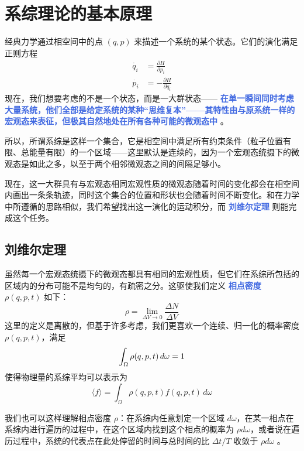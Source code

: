 
\chapter{系综理论的基本原理}\label{cha:系综理论的基本原理}

经典力学通过相空间中的点 $(q,p)$ 来描述一个系统的某个状态。它们的演化满足正则方程
\begin{align*}
    \dot{q_i} &= \frac{\partial H}{\partial p_i} \\
    \dot{p_i} &= -\frac{\partial H}{\partial q_i}
\end{align*}
现在，我们想要考虑的不是一个状态，而是一大群状态——  \textcolor{RoyalBlue}{\textbf{\kaishu 在单一瞬间同时考虑大量系统，他们全部是给定系统的某种“思维复本”——其特性由与原系统一样的宏观态来表征，但极其自然地处在所有各种可能的微观态中}} \cite{Pathria}。

所以，所谓系综是这样一个集合，它是相空间中满足所有约束条件（粒子位置有限、总能量有限）的一个区域——这里默认是连续的，因为一个宏观态统摄下的微观态是如此之多，以至于两个相邻微观态之间的间隔足够小。

现在，这一大群具有与宏观态相同宏观性质的微观态随着时间的变化都会在相空间内画出一条条轨迹，同时这个集合的位置和形状也会随着时间不断变化。和在力学中所遵循的思路相似，我们希望找出这一演化的运动积分，而 \textcolor{RoyalBlue}{\textbf{\kaishu 刘维尔定理}} 则能完成这个任务。

\section{刘维尔定理}\label{sec:刘维尔定理}

虽然每一个宏观态统摄下的微观态都具有相同的宏观性质，但它们在系综所包括的区域内的分布可能不是均匀的，有疏密之分。这驱使我们定义 \textcolor{RoyalBlue}{\textbf{\kaishu 相点密度}} $\rho(q,p,t)$ 如下：
\begin{equation}
    \rho = \lim_{\Delta V\rightarrow 0} \frac{\Delta N}{\Delta V} 
\end{equation}
这里的定义是离散的，但基于许多考虑，我们更喜欢一个连续、归一化的概率密度 $\rho(q,p,t)$，满足
\begin{equation}
    \int_\Omega \rho(q,p,t)\,d\omega = 1 \\
\end{equation}
使得物理量的系综平均可以表示为
\begin{equation}
    \langle f \rangle =  \int_\Omega \rho(q,p,t)f(q,p,t)\,d\omega
\end{equation}

我们也可以这样理解相点密度 $\rho$：在系综内任意划定一个区域 $d \omega$，在某一相点在系综内进行遍历的过程中，在这个区域内找到这个相点的概率为 $\rho d \omega$，或者说在遍历过程中，系统的代表点在此处停留的时间与总时间的比 $\Delta t / T$  收敛于 $\rho d \omega$ 。

